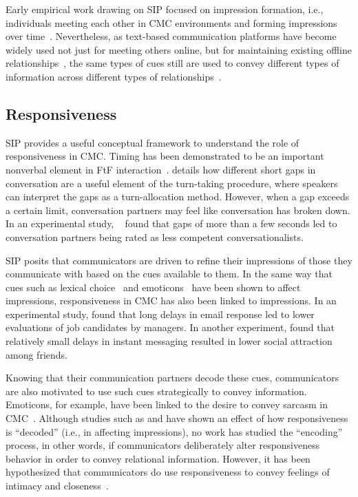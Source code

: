 \documentclass[12pt]{nuthesis}	%
\begin{document}
Early empirical work drawing on SIP focused on impression formation, i.e., individuals meeting each other in CMC environments and forming impressions over time~\citep[e.g.,][]{hancock2001impression,markey2002interpersonal,tanis2003social}. Nevertheless, as text-based communication platforms have become widely used not just for meeting others online, but for maintaining existing offline relationships~\citep{grinter2006chatting,pettegrew2015smart}, the same types of cues still are used to convey different types of information across different types of relationships~\citep{derks2008emoticons,pirzadeh2012expression}.

\subsection{Responsiveness}
SIP provides a useful conceptual framework to understand the role of responsiveness in CMC. Timing has been demonstrated to be an important nonverbal element in FtF interaction~\citep{burgoon2016nonverbal}. \citet{mclaughlin1984conversation} details how different short gaps in conversation are a useful element of the turn-taking procedure, where speakers can interpret the gaps as a turn-allocation method. However, when a gap exceeds a certain limit, conversation partners may feel like conversation has broken down. In an experimental study, ~\citet{mclaughlin1982awkward} found that gaps of more than a few seconds led to conversation partners being rated as less competent conversationalists.

SIP posits that communicators are driven to refine their impressions of those they communicate with based on the cues available to them. In the same way that cues such as lexical choice~\citep{muir2017linguistic,nguyen2016effects} and emoticons~\citep{tossell2012longitudinal, walther2001impacts} have been shown to affect impressions, responsiveness in CMC has also been linked to impressions. In an experimental study, \citet{kalman2011online} found that long delays in email response led to lower evaluations of job candidates by managers. In another experiment, \citet{heston2017worth} found that relatively small delays in instant messaging resulted in lower social attraction among friends.

Knowing that their communication partners decode these cues, communicators are also motivated to use such cues strategically to convey information. Emoticons, for example, have been linked to the desire to convey sarcasm in CMC~\citep{wolf2000emotional}. Although studies such as \citet{kalman2011online} and \citet{heston2017worth} have shown an effect of how responsiveness is ``decoded'' (i.e., in affecting impressions), no work has studied the ``encoding'' process, in other words, if communicators deliberately alter responsiveness behavior in order to convey relational information. However, it has been hypothesized that communicators do use responsiveness to convey feelings of intimacy and closeness~\citep{kalman2006pauses,walther1995nonverbal}.
\end{document}
